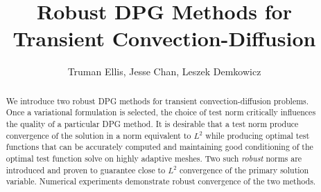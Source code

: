 \documentclass{article}
\title{Robust DPG Methods for Transient Convection-Diffusion}
\author{Truman Ellis, Jesse Chan, Leszek Demkowicz}
\date{}
\theoremstyle{definition}
\theoremstyle{remark}
\begin{document}
\maketitle








\begin{abstract}
We introduce two robust DPG methods for transient convection-diffusion problems.	
Once a variational formulation is selected, the choice of test norm critically influences the quality of a particular DPG method.
It is desirable that a test norm produce convergence of the solution in a norm equivalent to $L^2$ while producing optimal test functions 
that can be accurately computed and maintaining good conditioning of the optimal test function solve on highly adaptive meshes.
Two such \emph{robust} norms are introduced and proven to guarantee close to $L^2$ convergence of the primary solution variable.
Numerical experiments demonstrate robust convergence of the two methods.
\end{abstract}
\end{document}
